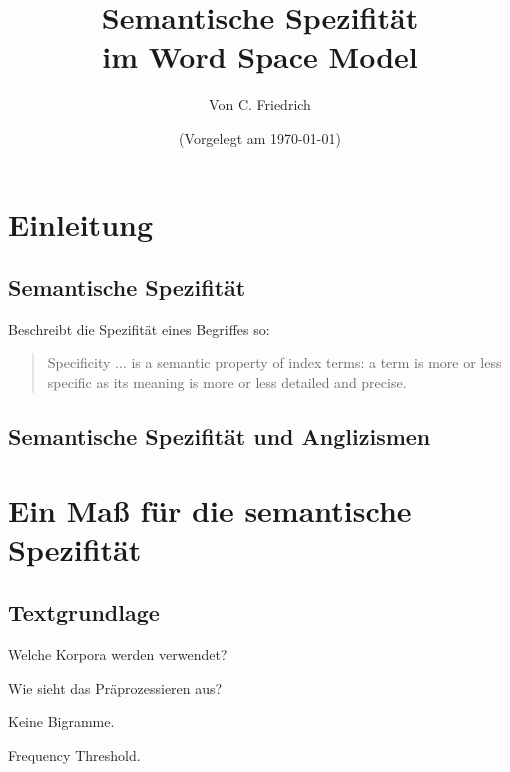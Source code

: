 \documentclass[11pt,numbers=noenddot]{scrartcl}
\title{Semantische Spezifität \\im Word Space Model}
\author{Von C. Friedrich}
\date{(Vorgelegt am \today)}
\begin{document}
\begin{titlepage}
\maketitle



\thispagestyle{empty}
\end{titlepage}



\tableofcontents
\newpage

\section{Einleitung}
\subsection*{Semantische Spezifität}

\citet[11]{sparckjones1972} Beschreibt die Spezifität eines Begriffes so:
\begin{quote}
  Specificity ... is a semantic property of index terms: a term is more or less specific as its meaning is more or less detailed and precise.
\end{quote}

\subsection*{Semantische Spezifität und Anglizismen}

\section{Ein Maß für die semantische Spezifität}

\subsection{Textgrundlage}

Welche Korpora werden verwendet?

Wie sieht das Präprozessieren aus?

Keine Bigramme.

Frequency Threshold.
\end{document}
